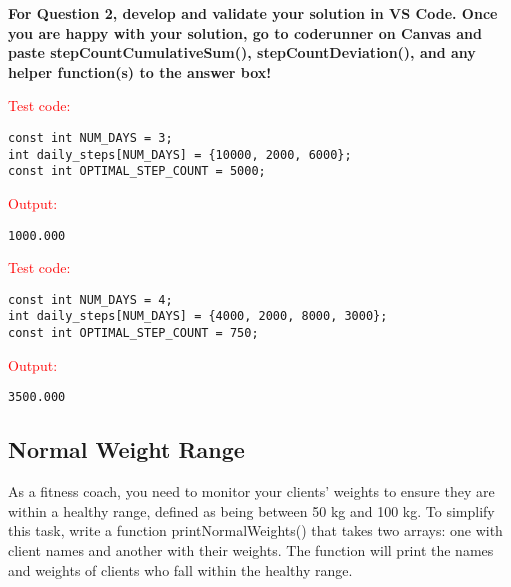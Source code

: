 \textbf{For Question 2, develop and validate your solution in VS Code. Once you are happy with your solution, go to coderunner on Canvas and paste stepCountCumulativeSum(),  stepCountDeviation(), and any helper function(s) to the answer box!} 

\begin{sample}
\textcolor{red}{Test code:}
\begin{verbatim}
const int NUM_DAYS = 3;
int daily_steps[NUM_DAYS] = {10000, 2000, 6000};
const int OPTIMAL_STEP_COUNT = 5000;
\end{verbatim}
\textcolor{red}{Output:}
\begin{verbatim}
1000.000
\end{verbatim}
\end{sample}

\begin{sample}
\textcolor{red}{Test code:}
\begin{verbatim}
const int NUM_DAYS = 4;
int daily_steps[NUM_DAYS] = {4000, 2000, 8000, 3000};
const int OPTIMAL_STEP_COUNT = 750;
\end{verbatim}
\textcolor{red}{Output:}
\begin{verbatim}
3500.000
\end{verbatim}
\end{sample}

\subsection{Normal Weight Range}

As a fitness coach, you need to monitor your clients' weights to ensure they are within a healthy range, defined as being between 50 kg and 100 kg. To simplify this task, write a function printNormalWeights() that takes two arrays: one with client names and another with their weights. The function will print the names and weights of clients who fall within the healthy range.

